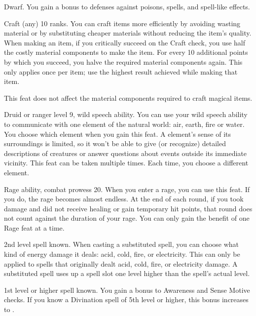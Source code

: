 \featpre Dwarf.
\featben You gain a  bonus to defenses against poisons, spells, and spell-like effects.

\featpre Craft (any) 10 ranks.
\featben You can craft items more efficiently by avoiding wasting material or by substituting cheaper materials without reducing the item's quality.
When making an item, if you critically succeed on the Craft check, you use half the costly material components to make the item.
For every 10 additional points by which you succeed, you halve the required material components again.
This only applies once per item; use the highest result achieved while making that item.

This feat does not affect the material components required to craft magical items.

\featpres Druid or ranger level 9, wild speech ability.
\featben You can use your wild speech ability to communicate with one element of the natural world: air, earth, fire or water.
You choose which element when you gain this feat.
A element's sense of its surroundings is limited, so it won't be able to give (or recognize) detailed descriptions of creatures or answer questions about events outside its immediate vicinity.
 This feat can be taken multiple times.
Each time, you choose a different element.

\featpres Rage ability, combat prowess 20.
\featben When you enter a rage, you can use this feat. If you do, the rage becomes almost endless. At the end of each round, if you took damage and did not receive healing or gain temporary hit points, that round does not count against the duration of your rage.
 You can only gain the benefit of one Rage feat at a time.

\featpre 2nd level spell known.
\featben When casting a substituted spell, you can choose what kind of energy damage it deals: acid, cold, fire, or electricity.
This can only be applied to spells that originally dealt acid, cold, fire, or electricity damage.
A substituted spell uses up a spell slot one level higher than the spell's actual level.

\featpre 1st level or higher  spell known.
\featben You gain a  bonus to Awareness and Sense Motive checks.
If you know a Divination spell of 5th level or higher, this bonus increases to .

